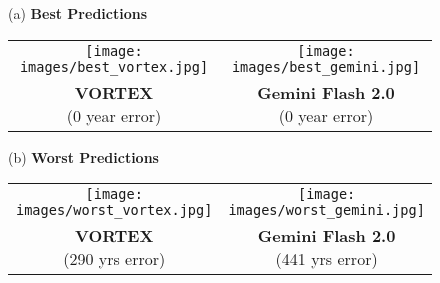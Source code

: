 \documentclass[10pt,twocolumn,letterpaper]{article}
\begin{document}
\begin{figure}[t]
\centering

(a) \textbf{Best Predictions} \\[0.5em]
\begin{tabular}{cc}
    \texttt{[image: images/best\_vortex.jpg]} &
    \texttt{[image: images/best\_gemini.jpg]} \\
    \makecell{\textbf{VORTEX}\\ (0 year error)} & \makecell{\textbf{Gemini Flash 2.0}\\ (0 year error)} \\
\end{tabular}

\vspace{0.5em}




\vspace{2em}

(b) \textbf{Worst Predictions} \\[0.5em]
\begin{tabular}{cc}
    \texttt{[image: images/worst\_vortex.jpg]} &
    \texttt{[image: images/worst\_gemini.jpg]} \\
    \makecell{\textbf{VORTEX}\\ (290 yrs error)} & \makecell{\textbf{Gemini Flash 2.0} \\ (441 yrs error)} \\
\end{tabular}

\vspace{0.5em}



\end{figure}
\end{document}
